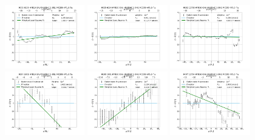 \begin{figure}
    \includegraphics[width=0.31\textwidth]{Images/WLSFITS/CC1/9002-6103.png}
    \includegraphics[width=0.31\textwidth]{Images/WLSFITS/CC1/9025-6104.png}
    \includegraphics[width=0.31\textwidth]{Images/WLSFITS/CC1/9182-12703.png}
    \includegraphics[width=0.31\textwidth]{Images/WLSFITS/CC1/9184-1901.png}
    \includegraphics[width=0.31\textwidth]{Images/WLSFITS/CC1/9195-1901.png}
    \includegraphics[width=0.31\textwidth]{Images/WLSFITS/CC1/9497-12704.png}

\end{figure}
